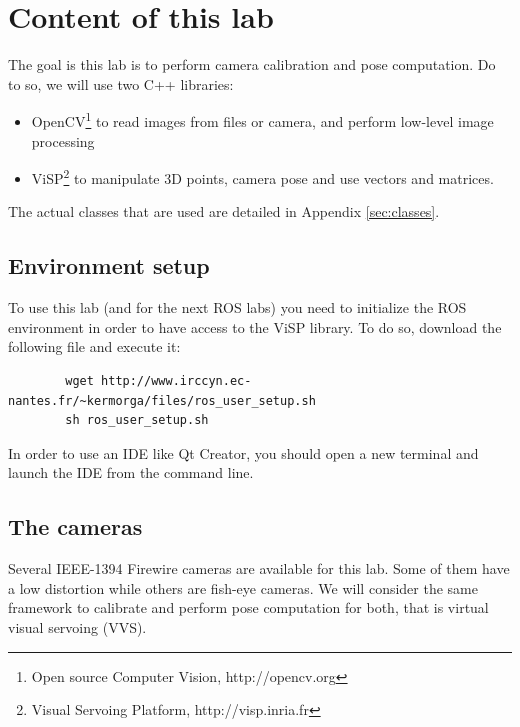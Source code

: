 \documentclass{ecnreport}
\begin{document}




\section{Content of this lab}

The goal is this lab is to perform camera calibration and pose computation. Do to so, we will use two C++ libraries:
\begin{itemize}
 \item OpenCV\footnote{Open source Computer Vision, http://opencv.org} to read images from files or camera, and perform low-level image processing
 \item ViSP\footnote{Visual Servoing Platform, http://visp.inria.fr} to manipulate 3D points, camera pose and use vectors and matrices.
\end{itemize}
The actual classes that are used are detailed in Appendix \ref{sec:classes}.\\

\subsection{Environment setup}

To use this lab (and for the next ROS labs) you need to initialize the ROS environment in order to have access to the ViSP library.
To do so, download the following file and execute it:
\begin{center}\cppstyle
\begin{lstlisting}
        wget http://www.irccyn.ec-nantes.fr/~kermorga/files/ros_user_setup.sh
        sh ros_user_setup.sh
\end{lstlisting}
\end{center}In order to use an IDE like Qt Creator, you should open a new terminal and launch the IDE from the command line.

\subsection{The cameras}

Several IEEE-1394 Firewire cameras are available for this lab. Some of them have a low distortion while others are fish-eye cameras. We will consider the 
same framework to calibrate and perform pose computation for both, that is virtual visual servoing (VVS).
\end{document}
